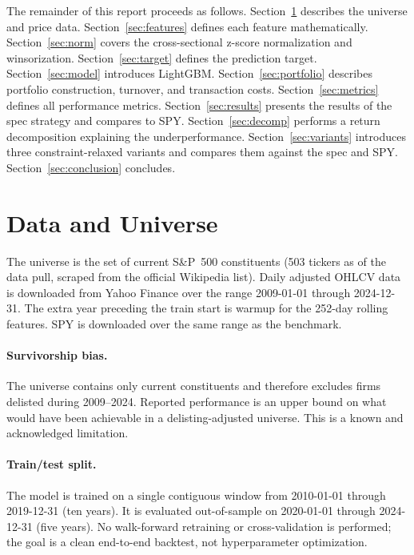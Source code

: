 \documentclass[11pt]{article}
\begin{document}
The remainder of this report proceeds as follows. Section~\ref{sec:data} describes the
universe and price data. Section~\ref{sec:features} defines each feature mathematically.
Section~\ref{sec:norm} covers the cross-sectional z-score normalization and winsorization.
Section~\ref{sec:target} defines the prediction target. Section~\ref{sec:model} introduces
LightGBM. Section~\ref{sec:portfolio} describes portfolio construction, turnover, and
transaction costs. Section~\ref{sec:metrics} defines all performance metrics.
Section~\ref{sec:results} presents the results of the spec strategy and compares to SPY.
Section~\ref{sec:decomp} performs a return decomposition explaining the underperformance.
Section~\ref{sec:variants} introduces three constraint-relaxed variants and compares
them against the spec and SPY. Section~\ref{sec:conclusion} concludes.

\section{Data and Universe}
\label{sec:data}
The universe is the set of current S\&P~500 constituents (503 tickers as of the data
pull, scraped from the official Wikipedia list). Daily adjusted OHLCV data is
downloaded from Yahoo Finance over the range 2009-01-01 through 2024-12-31. The extra
year preceding the train start is warmup for the 252-day rolling features. SPY is
downloaded over the same range as the benchmark.

\paragraph{Survivorship bias.} The universe contains only current constituents and
therefore excludes firms delisted during 2009--2024. Reported performance is an upper
bound on what would have been achievable in a delisting-adjusted universe. This is a
known and acknowledged limitation.

\paragraph{Train/test split.} The model is trained on a single contiguous window from
2010-01-01 through 2019-12-31 (ten years). It is evaluated out-of-sample on
2020-01-01 through 2024-12-31 (five years). No walk-forward retraining or cross-validation
is performed; the goal is a clean end-to-end backtest, not hyperparameter optimization.
\end{document}
